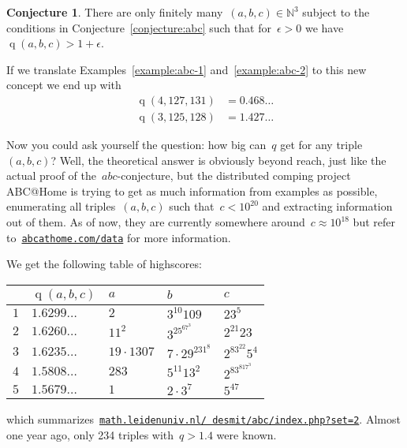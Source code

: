 \documentclass[11pt, a4paper, openany, oneside, article]{memoir}
\theoremstyle{definition}
\newtheorem{conjecture}[theorem]{Conjecture}
\DeclareMathOperator\quality{q}
\begin{document}
\begin{conjecture}
  There are only finitely many~$(a,b,c)\in\mathbb{N}^3$ subject to the conditions in Conjecture~\ref{conjecture:abc} such that for~$\epsilon>0$ we have~$\quality(a,b,c)>1+\epsilon$.
\end{conjecture}

If we translate Examples~\ref{example:abc-1} and~\ref{example:abc-2} to this new concept we end up with
\begin{equation}
  \begin{aligned}
    \quality(4,127,131)&=0.468\ldots \\
    \quality(3,125,128)&=1.427\ldots
  \end{aligned}
\end{equation}

Now you could ask yourself the question: how big can~$q$ get for any triple~$(a,b,c)$? Well, the theoretical answer is obviously beyond reach, just like the actual proof of the~$abc$\nobreakdash-con\-jecture, but  the distributed comping project ABC@Home is trying to get as much information from examples as possible, enumerating all triples~$(a,b,c)$ such that~$c<10^{20}$ and extracting information out of them. As of now, they are currently somewhere around~$c\approx10^{18}$ but refer to~\href{http://abcathome.com/data/}{\texttt{abcathome.com/data}} for more information.

We get the following table of highscores:

\begin{center}
  \begin{tabular}{cllll}
     & $\quality(a,b,c)$ & $a$ & $b$ & $c$ \\\midrule
    $1$ & $1.6299\ldots$ & $2$ & $3^{10}109$ & $23^5$ \\
    $2$ & $1.6260\ldots$ & $11^2$ & $3^25^67^3$ & $2^{21}23$ \\
    $3$ & $1.6235\ldots$ & $19\cdot1307$ & $7\cdot29^231^8$ & $2^83^{22}5^4$ \\
    $4$ & $1.5808\ldots$ & $283$ & $5^{11}13^2$ & $2^83^817^3$ \\
    $5$ & $1.5679\ldots$ & $1$ & $2\cdot3^7$ & $5^47$ \\
  \end{tabular}
\end{center}

which summarizes~\href{http://www.math.leidenuniv.nl/~desmit/abc/index.php?set=2}{\texttt{math.leidenuniv.nl/~desmit/abc/index.php?set=2}}. Almost one year ago, only 234 triples with~$q>1.4$ were known.
\end{document}
